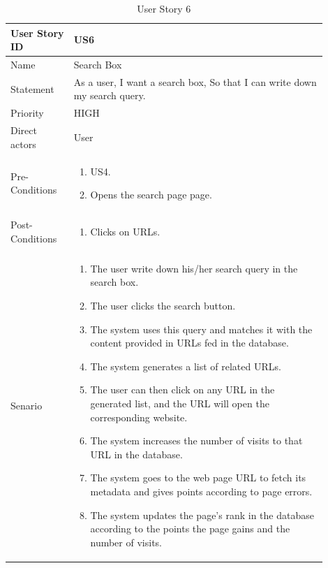 \documentclass{scrartcl}
\begin{document}
\begin{table}[H]
  \caption{User Story 6}
  \begin{tabular}{p{0.18\linewidth} | p{0.72\linewidth}}
    \toprule
    User Story ID & US6
    \\\midrule
    Name & Search Box
    \\\hline
    Statement & As a user, I want a search box, So that I can write down my search query.
    \\\hline
    Priority & HIGH
    \\\hline
    Direct actors & User
    \\\hline
    Pre-Conditions & {
                     \begin{enumerate}
                     \item US4.
                     \item Opens the search page page.
                     \end{enumerate}
                     }\vspace*{-\baselineskip}
    \\\hline
    Post-Conditions & {
                      \begin{enumerate}
                      \item Clicks on URLs.
                      \end{enumerate}
                      }\vspace*{-\baselineskip}
    \\\hline
    Senario & {
              \begin{enumerate}
              \item The user write down his/her search query in the search box.
              \item The user clicks the search button.
              \item The system uses this query and matches it with the content provided in URLs fed in the database.
              \item The system generates a list of related URLs.
              \item The user can then click on any URL in the generated list, and the URL will open the corresponding website.
              \item The system increases the number of visits to that URL in the database.
              \item The system goes to the web page URL to fetch its metadata and gives points according to page errors.
              \item The system updates the page's rank in the database according to the points the page gains and the number of visits.
              \end{enumerate}
              }\vspace*{-\baselineskip}
    \\\bottomrule
  \end{tabular}
\end{table}
\end{document}
